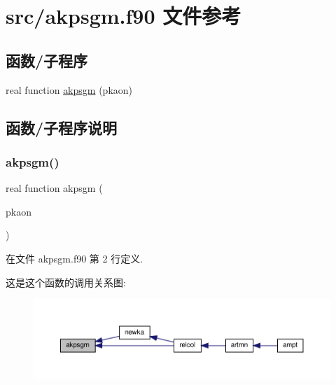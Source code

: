 \hypertarget{akpsgm_8f90}{}\section{src/akpsgm.f90 文件参考}
\label{akpsgm_8f90}
\subsection*{函数/子程序}
\begin{DoxyCompactItemize}
\item 
real function \mbox{\hyperlink{akpsgm_8f90_a2a2aa4811ce620bf6b2792ed1fc4353f}{akpsgm}} (pkaon)
\end{DoxyCompactItemize}


\subsection{函数/子程序说明}
\mbox{\label{akpsgm_8f90_a2a2aa4811ce620bf6b2792ed1fc4353f}} 
\subsubsection{\texorpdfstring{akpsgm()}{akpsgm()}}
{\footnotesize\ttfamily real function akpsgm (\begin{DoxyParamCaption}\item[{}]{pkaon }\end{DoxyParamCaption})}



在文件 akpsgm.\+f90 第 2 行定义.

这是这个函数的调用关系图\+:
\nopagebreak
\begin{figure}[H]
\begin{center}
\leavevmode
\includegraphics[width=350pt]{akpsgm_8f90_a2a2aa4811ce620bf6b2792ed1fc4353f_icgraph}
\end{center}
\end{figure}
